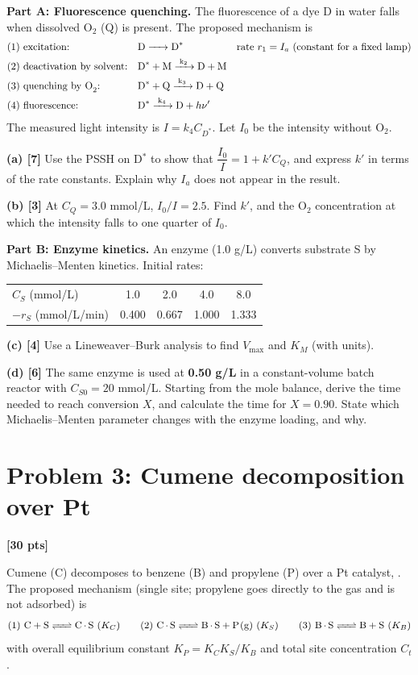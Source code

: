 \documentclass[11pt]{article}
\newcommand{\problem}[2]{\section*{Problem #1: #2}}
\newcommand{\pts}[1]{\hfill\textbf{[#1 pts]}}
\newcommand{\workspace}[1]{\par\vspace{#1}}
\begin{document}
\textbf{Part A: Fluorescence quenching.} The fluorescence of a dye D in water falls when dissolved O$_2$ (Q) is
present. The proposed mechanism is
\begin{align*}
&\text{(1) excitation:} && \ce{D -> D^*} && \text{rate } r_1=I_a\ \text{(constant for a fixed lamp)}\\
&\text{(2) deactivation by solvent:} && \ce{D^* + M ->[k_2] D + M}\\
&\text{(3) quenching by O}_2\text{:} && \ce{D^* + Q ->[k_3] D + Q}\\
&\text{(4) fluorescence:} && \ce{D^* ->[k_4] D}+h\nu'
\end{align*}
The measured light intensity is $I=k_4C_{D^*}$. Let $I_0$ be the intensity without O$_2$.

\textbf{(a) [7]} Use the PSSH on D$^*$ to show that $\dfrac{I_0}{I}=1+k'C_Q$, and express $k'$ in terms of the rate constants.
Explain why $I_a$ does not appear in the result.
\workspace{6.5cm}

\textbf{(b) [3]} At $C_Q=3.0$ mmol/L, $I_0/I=2.5$. Find $k'$, and the O$_2$ concentration at which the intensity falls to one quarter of $I_0$.
\workspace{3.5cm}

\newpage
\textbf{Part B: Enzyme kinetics.} An enzyme (1.0 g/L) converts substrate S by Michaelis--Menten kinetics. Initial rates:
\begin{center}
\renewcommand{\arraystretch}{1.3}
\begin{tabular}{lcccc}
\toprule
$C_S$ (mmol/L) & 1.0 & 2.0 & 4.0 & 8.0\\
$-r_S$ (mmol/L/min) & 0.400 & 0.667 & 1.000 & 1.333\\
\bottomrule
\end{tabular}
\end{center}

\textbf{(c) [4]} Use a Lineweaver--Burk analysis to find $V_{\max}$ and $K_M$ (with units).
\workspace{5cm}

\textbf{(d) [6]} The same enzyme is used at \textbf{0.50 g/L} in a constant-volume batch reactor with $C_{S0}=20$ mmol/L.
Starting from the mole balance, derive the time needed to reach conversion $X$, and calculate the time for $X=0.90$.
State which Michaelis--Menten parameter changes with the enzyme loading, and why.
\workspace{7cm}

\newpage
\problem{3}{Cumene decomposition over Pt}\pts{30}

Cumene (C) decomposes to benzene (B) and propylene (P) over a Pt catalyst, . The proposed mechanism
(single site; propylene goes directly to the gas and is not adsorbed) is
\[
\text{(1) } \ce{C + S <=> C.S}\ (K_C)\qquad
\text{(2) } \ce{C.S <=> B.S + P(g)}\ (K_S)\qquad
\text{(3) } \ce{B.S <=> B + S}\ (K_B)
\]
with overall equilibrium constant $K_P=K_CK_S/K_B$ and total site concentration $C_t$.
\end{document}
